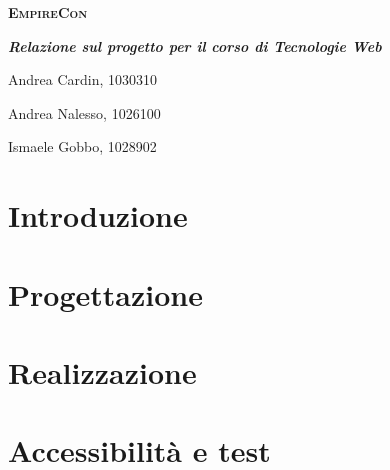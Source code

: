 \documentclass[12pt,a4paper]{article}
\begin{document}
\begin{titlepage}
	\centering
	\vspace*{4.5cm}
	{\scshape\LARGE \textbf{EmpireCon} \par}
	\vspace{0.5cm}
	{\Large \textbf{\textit{Relazione sul progetto per il corso di Tecnologie Web}}\par}
	\vspace{1cm}
	{\Large Andrea Cardin, 1030310\par}
	{\Large Andrea Nalesso, 1026100\par}
	{\Large Ismaele Gobbo, 1028902\par}
	\vspace*{\fill}
\end{titlepage}

\tableofcontents
\newpage

% 
% 

\section{Introduzione}


\section{Progettazione}


\section{Realizzazione}


\section{Accessibilità e test}

\end{document}
